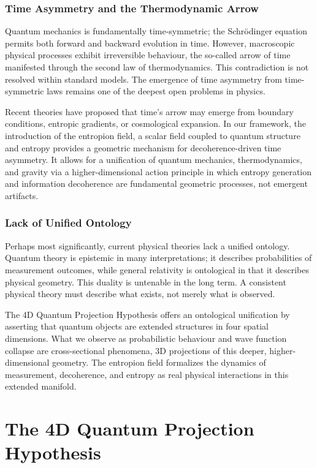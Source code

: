 \documentclass[12pt]{article}
\begin{document}
\subsubsection*{Time Asymmetry and the Thermodynamic Arrow}

Quantum mechanics is fundamentally time-symmetric; the Schrödinger equation permits both forward and backward evolution in time. However, macroscopic physical processes exhibit irreversible behaviour, the so-called arrow of time manifested through the second law of thermodynamics. This contradiction is not resolved within standard models. The emergence of time asymmetry from time-symmetric laws remains one of the deepest open problems in physics.

Recent theories have proposed that time's arrow may emerge from boundary conditions, entropic gradients, or cosmological expansion. In our framework, the introduction of the entropion field, a scalar field coupled to quantum structure and entropy provides a geometric mechanism for decoherence-driven time asymmetry. It allows for a unification of quantum mechanics, thermodynamics, and gravity via a higher-dimensional action principle in which entropy generation and information decoherence are fundamental geometric processes, not emergent artifacts.

\subsubsection*{Lack of Unified Ontology}

Perhaps most significantly, current physical theories lack a unified ontology. Quantum theory is epistemic in many interpretations; it describes probabilities of measurement outcomes, while general relativity is ontological in that it describes physical geometry. This duality is untenable in the long term. A consistent physical theory must describe what exists, not merely what is observed.

The 4D Quantum Projection Hypothesis offers an ontological unification by asserting that quantum objects are extended structures in four spatial dimensions. What we observe as probabilistic behaviour and wave function collapse are cross-sectional phenomena, 3D projections of this deeper, higher-dimensional geometry. The entropion field formalizes the dynamics of measurement, decoherence, and entropy as real physical interactions in this extended manifold.



\section{The 4D Quantum Projection Hypothesis}
\end{document}
